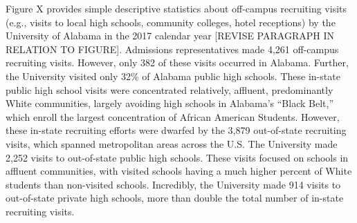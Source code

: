\documentclass[twoside]{article}
\begin{document}
Figure X provides simple descriptive statistics about off-campus recruiting visits (e.g., visits to local high schools, community colleges, hotel receptions) by the University of Alabama in the 2017 calendar year [REVISE PARAGRAPH IN RELATION TO FIGURE].  Admissions representatives made 4,261 off-campus recruiting visits.  However, only 382 of these visits occurred in Alabama.  Further, the University visited only 32\% of Alabama public high schools. These in-state public high school visits were concentrated relatively, affluent, predominantly White communities, largely avoiding high schools in Alabama's ``Black Belt,'' which enroll the largest concentration of African American Students.  However, these in-state recruiting efforts were dwarfed by the 3,879 out-of-state recruiting visits, which spanned metropolitan areas across the U.S. The University made 2,252 visits to out-of-state public high schools. These visits focused on schools in affluent communities, with visited schools having a much higher percent of White students than non-visited schools.  Incredibly, the University made 914 visits to out-of-state private high schools, more than double the total number of in-state recruiting visits.
\end{document}
